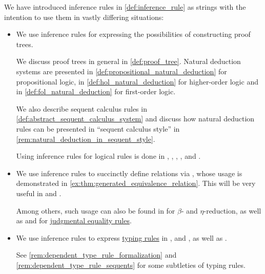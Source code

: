 \begin{remark}\label{rem:inference_rules_usage}
  We have introduced inference rules in \cref{def:inference_rule} as strings with the intention to use them in vastly differing situations:
  \begin{itemize}
    \item We use inference rules for expressing the possibilities of constructing proof trees.

    We discuss proof trees in general in \cref{def:proof_tree}. Natural deduction systems are presented in \cref{def:propositional_natural_deduction} for propositional logic, in \cref{def:hol_natural_deduction} for higher-order logic and in \cref{def:fol_natural_deduction} for first-order logic.

    We also describe sequent calculus rules in \cref{def:abstract_sequent_calculus_system} and discuss how natural deduction rules can be presented in \enquote{sequent calculus style} in \cref{rem:natural_deduction_in_sequent_style}.

    Using inference rules for logical rules is done in
    \cite{Gentzen1935LogischeSchließen},
    \cite{TroelstraSchwichtenberg2000BasicProofTheory},
    \cite{VanDalen2004LogicAndStructure},
    \cite{Mimram2020ProgramEqualsProof},
    \cite{КолмогоровДрагалин2006ЛогикаВведение} and
    \cite{Герасимов2014Вычислимость}.

    \item We use inference rules to succinctly define relations via , whose usage is demonstrated in \cref{ex:thm:generated_equivalence_relation}. This will be very useful in  and .

    Among others, such usage can also be found in \cite{Mimram2020ProgramEqualsProof} for \( \beta \)- and \( \eta \)-reduction, as well as \cite{MartinLöf1984IntuitionisticTypeTheory} and \cite{UnivalentFoundationsProgram2013HoTT} for \hyperref[rem:type_theory_rule_classification/equality]{judgmental equality rules}.

    \item We use inference rules to express \hyperref[con:typing_rule]{typing rules} in ,  and , as well as .

    See \cref{rem:dependent_type_rule_formalization} and \cref{rem:dependent_type_rule_sequents} for some subtleties of typing rules.
  \end{itemize}
\end{remark}

